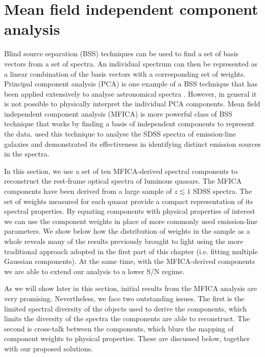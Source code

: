 \section[MFICA]{Mean field independent component analysis}

Blind source separation (BSS) techniques can be used to find a set of basis vectors from a set of spectra. 
An individual spectrum can then be represented as a linear combination of the basis vectors with a corresponding set of weights.  
Principal component analysis (PCA) is one example of a BSS technique that has been applied extensively to analyse astronomical spectra \citep[e.g.][]{mittaz90,francis92,yip04}. 
However, in general it is not possible to physically interpret the individual PCA components. 
Mean field independent component analysis (MFICA) is more powerful class of BSS technique that works by finding a basis of independent components to represent the data.  
\citet{allen13} used this technique to analyse the SDSS spectra of emission-line galaxies and demonstrated its effectiveness in identifying distinct emission sources in the spectra. 

In this section, we use a set of ten MFICA-derived spectral components to reconstruct the rest-frame optical spectra of luminous quasars.
The MFICA components have been derived from a large sample of $z \lesssim 1$ SDSS spectra.  
The set of weights measured for each quasar provide a compact representation of its spectral properties.  
By equating components with physical properties of interest we can use the component weights in place of more commonly used emission-line parameters. 
We show below how the distribution of weights in the sample as a whole reveals many of the results previously brought to light using the more traditional approach adopted in the first part of this chapter (i.e. fitting multiple Gaussian components). 
At the same time, with the MFICA-derived components we are able to extend our analysis to a lower S/N regime.

As we will show later in this section, initial results from the MFICA analysis are very promising.
Nevertheless, we face two outstanding issues.  
The first is the limited spectral diversity of the objects used to derive the components, which limits the diversity of the spectra the components are able to reconstruct. 
The second is cross-talk between the components, which blurs the mapping of component weights to physical properties. 
These are discussed below, together with our proposed solutions. 

